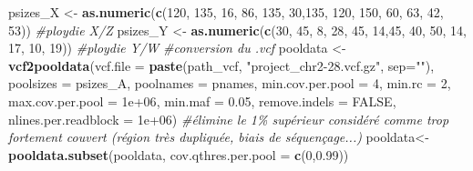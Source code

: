 \documentclass[
  openany]{book}
\newenvironment{Shaded}{\begin{snugshade}}{\end{snugshade}}
\newcommand{\AttributeTok}[1]{\textcolor[rgb]{0.13,0.29,0.53}{#1}}
\newcommand{\CommentTok}[1]{\textcolor[rgb]{0.56,0.35,0.01}{\textit{#1}}}
\newcommand{\ConstantTok}[1]{\textcolor[rgb]{0.56,0.35,0.01}{#1}}
\newcommand{\DecValTok}[1]{\textcolor[rgb]{0.00,0.00,0.81}{#1}}
\newcommand{\FloatTok}[1]{\textcolor[rgb]{0.00,0.00,0.81}{#1}}
\newcommand{\FunctionTok}[1]{\textcolor[rgb]{0.13,0.29,0.53}{\textbf{#1}}}
\newcommand{\NormalTok}[1]{#1}
\newcommand{\OtherTok}[1]{\textcolor[rgb]{0.56,0.35,0.01}{#1}}
\newcommand{\StringTok}[1]{\textcolor[rgb]{0.31,0.60,0.02}{#1}}
\theoremstyle{definition}
\theoremstyle{definition}
\theoremstyle{definition}
\theoremstyle{definition}
\theoremstyle{remark}
\begin{document}
\begin{Shaded}
\begin{Highlighting}[]
\NormalTok{psizes\_X }\OtherTok{\textless{}{-}} \FunctionTok{as.numeric}\NormalTok{(}\FunctionTok{c}\NormalTok{(}\StringTok{\textquotesingle{}120\textquotesingle{}}\NormalTok{, }\StringTok{\textquotesingle{}135\textquotesingle{}}\NormalTok{, }\StringTok{\textquotesingle{}16\textquotesingle{}}\NormalTok{, }\StringTok{\textquotesingle{}86\textquotesingle{}}\NormalTok{, }\StringTok{\textquotesingle{}135\textquotesingle{}}\NormalTok{, }\StringTok{\textquotesingle{}30\textquotesingle{}}\NormalTok{,}\StringTok{\textquotesingle{}135\textquotesingle{}}\NormalTok{, }\StringTok{\textquotesingle{}120\textquotesingle{}}\NormalTok{, }\StringTok{\textquotesingle{}150\textquotesingle{}}\NormalTok{, }\StringTok{\textquotesingle{}60\textquotesingle{}}\NormalTok{, }\StringTok{\textquotesingle{}63\textquotesingle{}}\NormalTok{, }\StringTok{\textquotesingle{}42\textquotesingle{}}\NormalTok{, }\StringTok{\textquotesingle{}53\textquotesingle{}}\NormalTok{))    }\CommentTok{\#ploydie X/Z}
\NormalTok{psizes\_Y }\OtherTok{\textless{}{-}} \FunctionTok{as.numeric}\NormalTok{(}\FunctionTok{c}\NormalTok{(}\StringTok{\textquotesingle{}30\textquotesingle{}}\NormalTok{, }\StringTok{\textquotesingle{}45\textquotesingle{}}\NormalTok{, }\StringTok{\textquotesingle{}8\textquotesingle{}}\NormalTok{, }\StringTok{\textquotesingle{}28\textquotesingle{}}\NormalTok{, }\StringTok{\textquotesingle{}45\textquotesingle{}}\NormalTok{, }\StringTok{\textquotesingle{}14\textquotesingle{}}\NormalTok{,}\StringTok{\textquotesingle{}45\textquotesingle{}}\NormalTok{, }\StringTok{\textquotesingle{}40\textquotesingle{}}\NormalTok{, }\StringTok{\textquotesingle{}50\textquotesingle{}}\NormalTok{, }\StringTok{\textquotesingle{}14\textquotesingle{}}\NormalTok{, }\StringTok{\textquotesingle{}17\textquotesingle{}}\NormalTok{, }\StringTok{\textquotesingle{}10\textquotesingle{}}\NormalTok{, }\StringTok{\textquotesingle{}19\textquotesingle{}}\NormalTok{))           }\CommentTok{\#ploydie Y/W}
\CommentTok{\#conversion du .vcf}
\NormalTok{pooldata }\OtherTok{\textless{}{-}} \FunctionTok{vcf2pooldata}\NormalTok{(}\AttributeTok{vcf.file =} \FunctionTok{paste}\NormalTok{(path\_vcf, }\StringTok{"project\_chr2{-}28.vcf.gz"}\NormalTok{, }\AttributeTok{sep=}\StringTok{""}\NormalTok{), }\AttributeTok{poolsizes =}\NormalTok{ psizes\_A, }\AttributeTok{poolnames =}\NormalTok{ pnames, }\AttributeTok{min.cov.per.pool =} \DecValTok{4}\NormalTok{, }\AttributeTok{min.rc =} \DecValTok{2}\NormalTok{, }\AttributeTok{max.cov.per.pool =} \FloatTok{1e+06}\NormalTok{, }\AttributeTok{min.maf =} \FloatTok{0.05}\NormalTok{, }\AttributeTok{remove.indels =} \ConstantTok{FALSE}\NormalTok{, }\AttributeTok{nlines.per.readblock =} \FloatTok{1e+06}\NormalTok{)}
\CommentTok{\#élimine le 1\% supérieur considéré comme trop fortement couvert (région très dupliquée, biais de séquençage...)}
\NormalTok{pooldata}\OtherTok{\textless{}{-}}\FunctionTok{pooldata.subset}\NormalTok{(pooldata, }\AttributeTok{cov.qthres.per.pool =} \FunctionTok{c}\NormalTok{(}\DecValTok{0}\NormalTok{,}\FloatTok{0.99}\NormalTok{))}
\end{Highlighting}
\end{Shaded}
\end{document}
